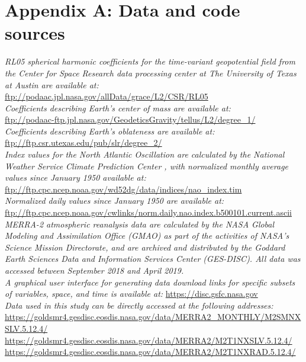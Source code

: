 \newpage 
\appendix

\section{Appendix A: Data and code sources \label{app:a}}

\textit{RL05 spherical harmonic coefficients for the time-variant geopotential field from the Center for Space Research data processing center at The University of Texas at Austin are available at:} \\
\indent \url{ftp://podaac.jpl.nasa.gov/allData/grace/L2/CSR/RL05}\\

\noindent\textit{Coefficients describing Earth's center of mass \cite[spherical harmonic degree~1, from][]{swenson2008} are available at:} \\
\indent\url{ftp://podaac-ftp.jpl.nasa.gov/GeodeticsGravity/tellus/L2/degree_1/}\\

\noindent\textit{Coefficients describing Earth's oblateness \cite[spherical harmonic degree~2, order~0, from][]{cheng2013} are available at:} \\
\indent \url{ftp://ftp.csr.utexas.edu/pub/slr/degree_2/}\\

\noindent\textit{Index values for the North Atlantic Oscillation are calculated by the National Weather Service Climate Prediction Center \cite[see][]{cpcNAO}, with normalized monthly average values since January 1950 available at:} \\
\indent \url{ftp://ftp.cpc.ncep.noaa.gov/wd52dg/data/indices/nao\_index.tim}\\
\indent\textit{Normalized daily values since January 1950 are available at:} \\
\indent \url{ftp://ftp.cpc.ncep.noaa.gov/cwlinks/norm.daily.nao.index.b500101.current.ascii}\\


\noindent\textit{MERRA-2 atmospheric reanalysis data are calculated by the NASA Global Modeling and Assimilation Office (GMAO) as part of the activities of NASA's Science Mission Directorate, and are archived and distributed by the Goddard Earth Sciences Data and Information Services Center (GES-DISC). All data was accessed between September 2018 and April 2019.} \\ 
\indent \textit{A graphical user interface for generating data download links for specific subsets of variables, space, and time is available at:} \url{https://disc.gsfc.nasa.gov}\\
\indent \textit{Data used in this study can be directly accessed at the following addresses:} \\
\indent \url{https://goldsmr4.gesdisc.eosdis.nasa.gov/data/MERRA2_MONTHLY/M2SMNXSLV.5.12.4/}\\
\indent \url{https://goldsmr4.gesdisc.eosdis.nasa.gov/data/MERRA2/M2T1NXSLV.5.12.4/}\\
\indent \url{https://goldsmr4.gesdisc.eosdis.nasa.gov/data/MERRA2/M2T1NXRAD.5.12.4/}\\


